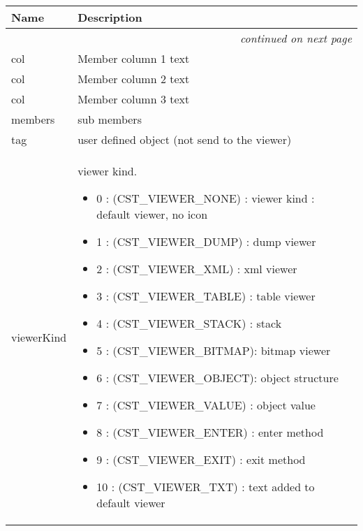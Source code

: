     \vspace{-1cm}
\hspace{\varindent}\begin{longtable}{|p{\varnamewidth}|p{\vardescrwidth}|l}
\cline{1-2}
\cline{1-2} \centering \textbf{Name} & \centering \textbf{Description}& \\
\cline{1-2}
\endhead\cline{1-2}\multicolumn{3}{r}{\small\textit{continued on next page}}\\\endfoot\cline{1-2}
\endlastfoot\raggedright c\-o\-l\-1\- & Member column 1 text&\\
\cline{1-2}
\raggedright c\-o\-l\-2\- & Member column 2 text&\\
\cline{1-2}
\raggedright c\-o\-l\-3\- & Member column 3 text&\\
\cline{1-2}
\raggedright m\-e\-m\-b\-e\-r\-s\- & sub members&\\
\cline{1-2}
\raggedright t\-a\-g\- & user defined object (not send to the viewer)&\\
\cline{1-2}
\raggedright v\-i\-e\-w\-e\-r\-K\-i\-n\-d\- & viewer kind.

          \begin{itemize}
          \setlength{\parskip}{0.6ex}
            \item 0 : (CST\_VIEWER\_NONE)  : viewer kind : default viewer, no 
              icon

            \item 1 : (CST\_VIEWER\_DUMP)  : dump viewer

            \item 2 : (CST\_VIEWER\_XML)   : xml viewer

            \item 3 : (CST\_VIEWER\_TABLE) : table viewer

            \item 4 : (CST\_VIEWER\_STACK) : stack

            \item 5 : (CST\_VIEWER\_BITMAP): bitmap viewer

            \item 6 : (CST\_VIEWER\_OBJECT): object structure

            \item 7 : (CST\_VIEWER\_VALUE) : object value

            \item 8 : (CST\_VIEWER\_ENTER) : enter method

            \item 9 : (CST\_VIEWER\_EXIT)  : exit method

            \item 10 : (CST\_VIEWER\_TXT)  : text added to default viewer

          \end{itemize}&\\
\cline{1-2}
\end{longtable}

